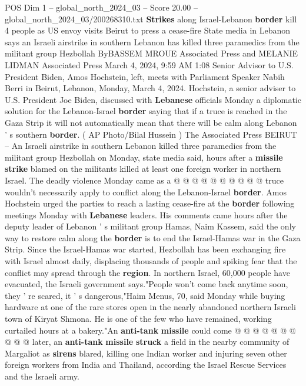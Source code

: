 \begin{textsample}{POS Dim 1 – global\_north\_2024\_03 – Score 20.00 – global\_north\_2024\_03/200268310.txt}  \label{ex:f1_pos_382}
\textbf{Strikes} along Israel-Lebanon \textbf{border} kill 4 people as US envoy visits Beirut to press a cease-fire State media in Lebanon says an Israeli airstrike in southern Lebanon has killed three paramedics from the militant group Hezbollah ByBASSEM MROUE Associated Press and MELANIE LIDMAN Associated Press March 4, 2024, 9:59 AM 1:08 Senior Advisor to U.S.
President Biden, Amos Hochstein, left, meets with Parliament Speaker Nabih Berri in Beirut, Lebanon, Monday, March 4, 2024.
Hochstein, a senior adviser to U.S.
President Joe Biden, discussed with \textbf{Lebanese} officials Monday a diplomatic solution for the Lebanon-Israel \textbf{border} saying that if a truce is reached in the Gaza Strip it will not automatically mean that there will be calm along Lebanon ' s southern \textbf{border}. ( AP Photo/Bilal Hussein ) The Associated Press BEIRUT -- An Israeli airstrike in southern Lebanon killed three paramedics from the militant group Hezbollah on Monday, state media said, hours after a \textbf{missile} \textbf{strike} blamed on the militants killed at least one foreign worker in northern Israel.
The deadly violence Monday came as a @ @ @ @ @ @ @ @ @ @ truce wouldn't necessarily apply to conflict along the Lebanon-Israel \textbf{border}.
Amos Hochstein urged the parties to reach a lasting cease-fire at the \textbf{border} following meetings Monday with \textbf{Lebanese} leaders.
His comments came hours after the deputy leader of Lebanon ' s militant group Hamas, Naim Kassem, said the only way to restore calm along the \textbf{border} is to end the Israel-Hamas war in the Gaza Strip.
Since the Israel-Hamas war started, Hezbollah has been exchanging fire with Israel almost daily, displacing thousands of people and spiking fear that the conflict may spread through the \textbf{region}.
In northern Israel, 60,000 people have evacuated, the Israeli government says."People won't come back anytime soon, they ' re scared, it ' s dangerous,"Haim Menus, 70, said Monday while buying hardware at one of the rare stores open in the nearly abandoned northern Israeli town of Kiryat Shmona.
He is one of the few who have remained, working curtailed hours at a bakery."An \textbf{anti-tank} \textbf{missile} could come @ @ @ @ @ @ @ @ @ @ later, an \textbf{anti-tank} \textbf{missile} \textbf{struck} a field in the nearby community of Margaliot as \textbf{sirens} blared, killing one Indian worker and injuring seven other foreign workers from India and Thailand, according the Israel Rescue Services and the Israeli army.

\end{textsample}
